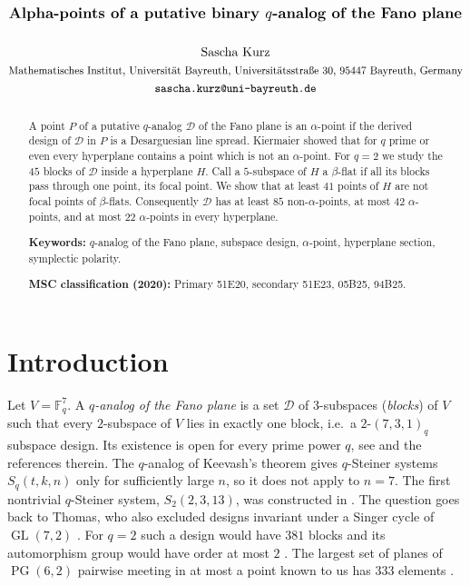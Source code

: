 \documentclass[11pt]{amsart}
\title[Alpha-points of a putative binary $q$-analog of the Fano plane]{$\text{\normalfont\large\bfseries Alpha-points of a putative binary $q$-analog of the Fano plane}$}
\author{$\text{\normalfont Sascha Kurz}$\\[3pt]
$\text{\normalfont\small Mathematisches Institut, Universit\"at Bayreuth, Universit\"atsstra\ss e 30, 95447 Bayreuth, Germany}$\\
$\text{\normalfont\small\texttt{sascha.kurz@uni-bayreuth.de}}$}
\date{}
\theoremstyle{definition}
\newcommand{\F}{\mathbb{F}}
\newcommand{\D}{\mathcal{D}}
\newcommand{\PG}{\operatorname{PG}}
\newcommand{\GL}{\operatorname{GL}}
\begin{document}
\begin{abstract}
A point $P$ of a putative $q$-analog $\D$ of the Fano plane is an $\alpha$-point if the derived design of $\D$ in $P$ is a Desarguesian line spread. Kiermaier showed that for $q$ prime or even every hyperplane contains a point which is not an $\alpha$-point. For $q=2$ we study the $45$ blocks of $\D$ inside a hyperplane $H$. Call a $5$-subspace of $H$ a $\beta$-flat if all its blocks pass through one point, its focal point. We show that at least $41$ points of $H$ are not focal points of $\beta$-flats. Consequently $\D$ has at least $85$ non-$\alpha$-points, at most $42$ $\alpha$-points, and at most $22$ $\alpha$-points in every hyperplane.

\medskip\noindent\textbf{Keywords:} $q$-analog of the Fano plane, subspace design, $\alpha$-point, hyperplane section, symplectic polarity.

\noindent\textbf{MSC classification (2020):} Primary 51E20, secondary 51E23, 05B25, 94B25.
\end{abstract}
\maketitle

\section{Introduction}

Let $V=\F_q^7$. A \emph{$q$-analog of the Fano plane} is a set $\D$ of $3$-subspaces (\emph{blocks}) of $V$ such that every $2$-subspace of $V$ lies in exactly one block, i.e.\ a $2$-$(7,3,1)_q$ subspace design. Its existence is open for every prime power $q$, see \cite{Kie22} and the references therein. The $q$-analog of Keevash's theorem \cite{Kee14,KSS25} gives $q$-Steiner systems $S_q(t,k,n)$ only for sufficiently large $n$, so it does not apply to $n=7$. The first nontrivial $q$-Steiner system, $S_2(2,3,13)$, was constructed in \cite{BEOVW16}. The question goes back to Thomas, who also excluded designs invariant under a Singer cycle of $\GL(7,2)$ \cite{Tho87}. For $q=2$ such a design would have $381$ blocks and its automorphism group would have order at most $2$ \cite{BKN16,KKW18}. The largest set of planes of $\PG(6,2)$ pairwise meeting in at most a point known to us has $333$ elements \cite{HKKW19}.
\end{document}

